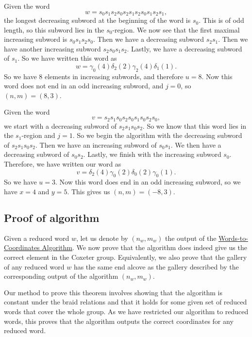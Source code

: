 \documentclass[11pt]{article}
\begin{document}
\begin{example}
    Given the word
    \[w=s_0s_1s_2s_0s_2s_1s_2s_0s_1s_2s_1,\]
    the longest decreasing subword at the beginning of the word is $s_0$. This is of odd length, so this subword lies in the $s_0$-region. We now see that the first maximal increasing subword is $s_0s_1s_2s_0$. Then we have a decreasing subword $s_2s_1$. Then we have another increasing subword $s_2s_0s_1s_2$. Lastly, we have a decreasing subword of $s_1$. So we have written this word as 
    \[w=\gamma_0(4)\delta_2(2)\gamma_2(4)\delta_1(1).\]
    So we have 8 elements in increasing subwords, and therefore $u=8$. Now this word does not end in an odd increasing subword, and $j=0$, so $(n,m)=(8,3)$. 
    \begin{center}
\end{center}
\end{example}

\begin{example}
    Given the word 
    \[v=s_2s_1s_0s_2s_0s_1s_0s_2s_0,\]
    we start with a decreasing subword of $s_2s_1s_0s_2$. So we know that this word lies in the $s_1$-region and $j=1$. So we begin the algorithm with the decreasing subword of $s_2s_1s_0s_2$. Then we have an increasing subword of $s_0s_1$. We then have a decreasing subword of $s_0s_2$. Lastly, we finish with the increasing subword $s_0$. Therefore, we have written our word as 
    \[v=\delta_2(4)\gamma_0(2)\delta_0(2)\gamma_0(1).\]
    So we have $u=3$. Now this word does end in an odd increasing subword, so we have $x=4$ and $y=5$. This gives us $(n,m)=(-8,3)$.

    \begin{center}

\end{center}
\end{example}



\subsection{Proof of algorithm}
Given a reduced word $w$, let us denote by $(n_w,m_w)$ the output of the \hyperref[algorithm]{Words-to-Coordinates Algorithm}. We now prove that the algorithm does indeed give us the correct element in the Coxeter group. Equivalently, we also prove that the gallery of any reduced word $w$ has the same end alcove as the gallery described by the corresponding output of the algorithm $(n_w,m_w)$. 


Our method to prove this theorem involves showing that the algorithm is constant under the braid relations and that it holds for some given set of reduced words that cover the whole group. As we have restricted our algorithm to reduced words, this proves that the algorithm outputs the correct coordinates for any reduced word.
\end{document}
